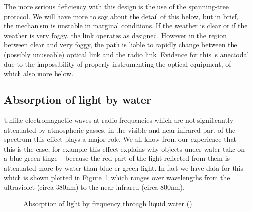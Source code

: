 The more serious deficiency with this design is the use of the
spanning-tree protocol. We will have more to say about the detail of
this below, but in brief, the mechanism is unstable in marginal
conditions. If the weather is clear or if the weather is very foggy,
the link operates as designed. However in the region between clear and
very foggy, the path is liable to rapidly change between the (possibly
unuseable) optical link and the radio link. Evidence for this is
anectodal due to the impossibility of properly instrumenting the
optical equipment, of which also more below.
\clearpage

\subsection{Absorption of light by water}
\label{sec:absorption}

Unlike electromagnetic waves at radio frequencies which are not
significantly attenuated by atmospheric gasses, in the visible and
near-infrared part of the spectrum this effect plays a major role. We
all know from our experience that this is the case, for example this
effect explains why objects under water take on a blue-green tinge --
because the red part of the light reflected from them is attenuated
more by water than blue or green light. In fact we have data for this
which is shown plotted in Figure~\ref{fig:absorption-liquid} which
ranges over wavelengths from the ultraviolet (circa 380nm) to the
near-infrared (circa 800nm).
\begin{figure}[h]
  \centering
  \caption{Absorption of light by frequency through liquid water
    (\cite{jonasz_absorption_2007})}
  \label{fig:absorption-liquid}
\end{figure}

